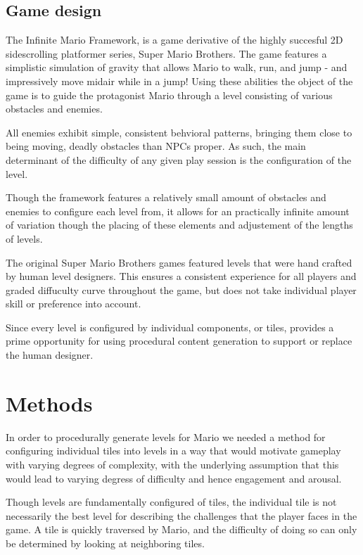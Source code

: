 \documentclass{llncs}
\begin{document}
\subsection{Game design}
The Infinite Mario Framework, is a game derivative of the highly succesful 2D sidescrolling platformer series, Super Mario Brothers. The game features a simplistic simulation of gravity that allows Mario to walk, run, and jump - and impressively move midair while in a jump! Using these abilities the object of the game is to guide the protagonist Mario through a level consisting of various obstacles and enemies.

All enemies exhibit simple, consistent behvioral patterns, bringing them close to being moving, deadly obstacles than NPCs proper. As such, the main determinant of the difficulty of any given play session is the configuration of the level.

Though the framework features a relatively small amount of obstacles and enemies to configure each level from, it allows for an practically infinite amount of variation though the placing of these elements and adjustement of the lengths of levels.

The original Super Mario Brothers games featured levels that were hand crafted by human level designers. This ensures a consistent experience for all players and graded diffuculty curve throughout the game, but does not take individual player skill or preference into account.

Since every level is configured by individual components, or tiles, provides a prime opportunity for using procedural content generation to support or replace the human designer.

\section{Methods}
In order to procedurally generate levels for Mario we needed a method for configuring individual tiles into levels in a way that would motivate gameplay with varying degrees of complexity, with the underlying assumption that this would lead to varying degress of difficulty and hence engagement and arousal.

Though levels are fundamentally configured of tiles, the individual tile is not necessarily the best level for describing the challenges that the player faces in the game. A tile is quickly traversed by Mario, and the difficulty of doing so can only be determined by looking at neighboring tiles.
\end{document}

